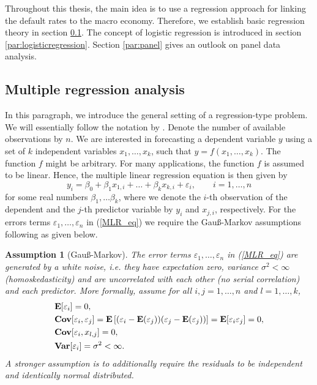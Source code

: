 \documentclass[a4paper, 12pt]{scrreprt}
\newtheorem{Assumption}[Theorem]{Assumption}
\newcommand{\ew}{\mbox{\textbf{E}}}
\newcommand{\var}{\mbox{\textbf{Var}}}
\newcommand{\cov}{\mbox{\textbf{Cov}}}
\begin{document}
Throughout this thesis, the main idea is to use a regression approach for linking the default rates to the macro economy. Therefore, we establish basic regression theory in section \ref{par:regression}. The concept of logistic regression is introduced in section \ref{par:logisticregression}. Section \ref{par:panel} gives an outlook on panel data analysis.

\subsection{Multiple regression analysis}\label{par:regression}
 
In this paragraph, we introduce the general setting of a regression-type problem. We will essentially follow the notation by \textcite[chapter 5]{hyndman2014forecasting}. Denote the number of available observations by $n$. We are interested in forecasting a dependent variable $y$ using a set of $k$ independent variables $x_1, \ldots, x_k$, such that
$y=f(x_1,\ldots,x_k)$. The function $f$ might be arbitrary. For many applications, the function $f$ is assumed to be linear. Hence, the multiple linear regression equation is then given by 
\begin{equation}\label{MLR_eq}
y_i = \beta_0 + \beta_1 x_{1,i} + \ldots + \beta_k x_{k,i} + \varepsilon_i, \qquad i=1,\ldots, n
\end{equation}
for some real numbers $\beta_1, \ldots \beta_k$, where we denote the $i$-th observation of the dependent and the $j$-th predictor variable by $y_i$ and $x_{j,i}$, respectively. 
For the errors terms $\varepsilon_1, \ldots, \varepsilon_n$ in (\ref{MLR_eq}) we require the Gauß-Markov assumptions following \textcite[chapter 1.1.2]{ameniya1985advance} as given below.

\begin{Assumption}[Gauß-Markov] \upshape \label{assumption:gauss}
The error terms $\varepsilon_1, \ldots, \varepsilon_n$ in (\ref{MLR_eq}) are generated by a white noise, i.e. they have expectation zero, variance $\sigma^2 < \infty$ (homoskedasticity) and are uncorrelated with each other (no serial correlation) and each predictor. More formally, assume for all $i,j = 1,\ldots, n$ and $l=1,\ldots,k$,	
	\begin{align}
	& \ew[\varepsilon_i] = 0, \\
	&\cov[\varepsilon_i, \varepsilon_j] = \ew \left[ (\varepsilon_i - \ew(\varepsilon_j)) (\varepsilon_j - \ew(\varepsilon_j)) \right] = \ew[\varepsilon_i \varepsilon_j] = 0, \\
	&\cov[\varepsilon_i, x_{l,j}] = 0, \\
	& \var[\varepsilon_i] = \sigma^2 < \infty.
	\end{align}
A stronger assumption is to additionally require the residuals to be independent and identically normal distributed.
\end{Assumption}
\end{document}
